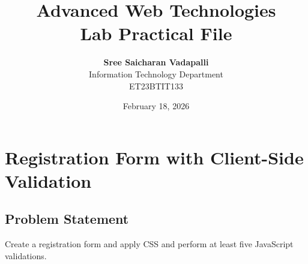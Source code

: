 \documentclass[12pt, a4paper]{report}
\begin{document}
    \title{\huge Advanced Web Technologies \\ Lab Practical File}
    \author{
        \textbf{Sree Saicharan Vadapalli} \\
        Information Technology Department \\
        ET23BTIT133 \\
    }
    \date{February 18, 2026}
    \maketitle
    \newpage

    \tableofcontents
    \newpage

    \renewcommand{\chaptername}{Practical}

    \chapter{Registration Form with Client-Side Validation}

    \section{Problem Statement}
    Create a registration form and apply CSS and perform at least five JavaScript validations.
\end{document}
